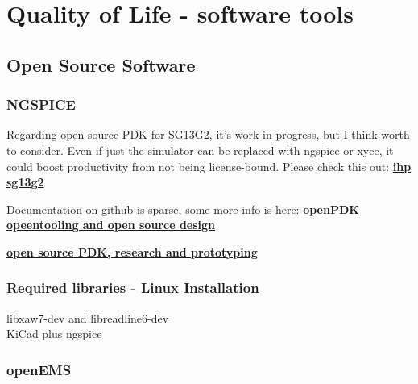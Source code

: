 \documentclass{article}
\begin{document}

\section{Quality of Life - software tools}

\subsection{Open Source Software}

\subsubsection{NGSPICE}


Regarding open-source PDK for SG13G2, it's work in progress, but
I think worth to consider. Even if just the simulator can be replaced
with ngspice or xyce, it could boost productivity from not being license-bound.
Please check this out:
\href{https://github.com/IHP-GmbH/IHP-Open-PDK/tree/main/ihp-sg13g2}{\textbf{ihp sg13g2}}

Documentation on github is sparse, some more info is here:
\href{https://www.ihp-microelectronics.com/events-1/detail/openpdk-opentooling-and-open-source-design-an-initiative-to-push-development}{\textbf{openPDK opeentooling and open source design}}

\href{https://www.ihp-microelectronics.com/services/research-and-prototyping-service/fast-design-enablement/open-source-pdk}{\textbf{open source PDK, research and prototyping}}



\subsubsection{Required libraries - Linux Installation}

libxaw7-dev and libreadline6-dev
\\
KiCad plus ngspice




\subsubsection{openEMS}
\end{document}
